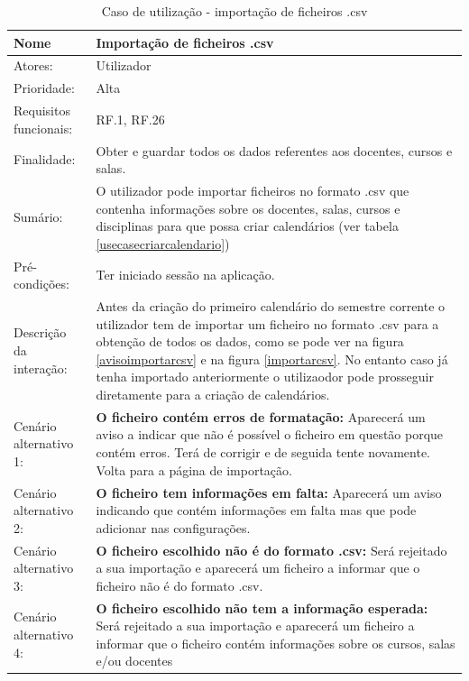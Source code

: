 \documentclass[11pt, twoside]{report}
\begin{document}
\def\arraystretch{1.5}
\begin{table}[H]
	\caption{Caso de utilização - importação de ficheiros .csv}
	\label{usecaseimportarcsv}
	\begin{center}	
		\begin{tabularx}{\textwidth}{|l|X|}
			\hline
			\textbf{Nome }	& \textbf{Importação de ficheiros .csv} \\
			\hline
			Atores: & Utilizador\\
			\hline
			Prioridade: &  Alta\\
			\hline
			Requisitos funcionais:&  RF.1, RF.26\\
			\hline
			Finalidade: & Obter e guardar todos os dados referentes aos docentes, cursos e salas. \\
			\hline
			Sumário: & O utilizador pode importar ficheiros no formato .csv que contenha informações sobre os docentes, salas, cursos e disciplinas para que possa criar calendários (ver tabela \ref{usecasecriarcalendario})\\
			\hline
			Pré-condições: & Ter iniciado sessão na aplicação.\\
			\hline
			Descrição da interação:& Antes da criação do primeiro calendário do semestre corrente o utilizador tem de importar um ficheiro no formato .csv para a obtenção de todos os dados, como se pode ver na figura \ref{avisoimportarcsv} e na figura \ref{importarcsv}. No entanto caso já tenha importado anteriormente o utilizaodor pode prosseguir diretamente para a criação de calendários.\\
			\hline
			Cenário alternativo 1: &\textbf{O ficheiro contém erros de formatação:} Aparecerá um aviso a indicar que não é possível o ficheiro em questão porque contém erros. Terá de corrigir e de seguida tente novamente. Volta para a página de importação.\\
			\hline
			Cenário alternativo 2: &\textbf{O ficheiro tem informações em falta:} Aparecerá um aviso indicando que contém informações em falta mas que pode adicionar nas configurações.\\
			\hline
			Cenário alternativo 3: &\textbf{O ficheiro escolhido não é do formato .csv:} Será rejeitado a sua importação e aparecerá um ficheiro a informar que o ficheiro não é do formato .csv.\\
			\hline
			Cenário alternativo 4: &\textbf{O ficheiro escolhido não tem a informação esperada:} Será rejeitado a sua importação e aparecerá um ficheiro a informar que o ficheiro contém informações sobre os cursos, salas e/ou docentes\\
			\hline
		\end{tabularx}
	\end{center}
\end{table}
\end{document}
